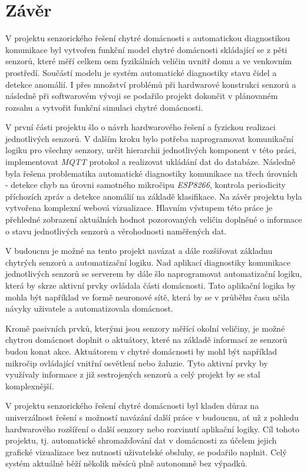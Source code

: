 \chapter{Závěr} \label{chap:conclusion}
V projektu senzorického řešení chytré domácnosti s automatickou diagnostikou komunikace byl vytvořen funkční model chytré domácnosti skládající se z pěti senzorů, které měří celkem osm fyzikálních veličin uvnitř domu a ve venkovním prostředí. Součástí modelu je systém automatické diagnostiky stavu čidel a detekce anomálií. I přes množství problémů při hardwarové konstrukci senzorů a následně při softwarovém vývoji se podařilo projekt dokončit v plánovaném rozsahu a vytvořit funkční simulaci chytré domácnosti.  \par
V první části projektu šlo o návrh hardwarového řešení a fyzickou realizaci jednotlivých senzorů. V dalším kroku bylo potřeba naprogramovat komunikační logiku pro všechny senzory, určit hierarchii jednotlivých komponent v této práci, implementovat \textit{MQTT} protokol a realizovat ukládání dat do databáze. Následně byla řešena problematika automatické diagnostiky komunikace na třech úrovních - detekce chyb na úrovni samotného mikročipu \textit{ESP8266}, kontrola periodicity příchozích zpráv a detekce anomálií na základě klasifikace. Na závěr projektu byla vytvořena komplexní webová vizualizace. Hlavním výstupem této práce je přehledné zobrazení aktuálních hodnot pozorovaných veličin doplněné o informace o stavu jednotlivých senzorů a věrohodnosti naměřených dat. \par
V budoucnu je možné na tento projekt navázat a dále rozšiřovat základnu chytrých senzorů a automatizační logiku. Nad aplikací diagnostiky komunikace jednotlivých senzorů se serverem by dále šlo naprogramovat automatizační logiku, která by skrze aktivní prvky ovládala části domácnosti. Tato aplikační logika by mohla být například ve formě neuronové sítě, která by se v průběhu času učila návyky uživatele a automatizovala domácnost. \par
Kromě pasivních prvků, kterými jsou senzory měřící okolní veličiny, je možné chytrou domácnost doplnit o aktuátory, které na základě informací ze senzorů budou konat akce. Aktuátorem v chytré domácnosti by mohl být například mikročip ovládající vnitřní osvětlení nebo žaluzie. Tyto aktivní prvky by využívaly informace z již sestrojených senzorů a celý projekt by se stal komplexnější. \par 
V projektu senzorického řešení chytré domácnosti byl kladen důraz na univerzálnost řešení s možností navázání další práce v budoucnu, ať už z pohledu hardwarového rozšíření o další senzory nebo rozvinutí aplikační logiky. Cíl tohoto projektu, tj. automatické shromažďování dat v domácnosti za účelem jejich grafické vizualizace bez nutnosti uživatelské obsluhy, se podařilo naplnit. Celý systém aktuálně běží několik měsíců plně autonomně bez výpadků.